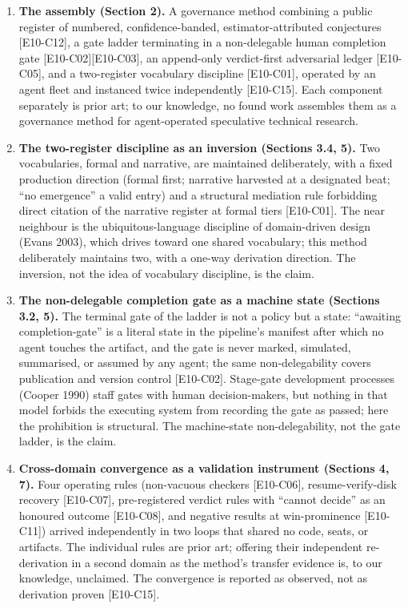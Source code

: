 \documentclass[
  11pt,
]{article}
\begin{document}
\begin{enumerate}
\def\labelenumi{\arabic{enumi}.}
\item
  \textbf{The assembly (Section 2).} A governance method combining a
  public register of numbered, confidence-banded, estimator-attributed
  conjectures {[}E10-C12{]}, a gate ladder terminating in a
  non-delegable human completion gate {[}E10-C02{]}{[}E10-C03{]}, an
  append-only verdict-first adversarial ledger {[}E10-C05{]}, and a
  two-register vocabulary discipline {[}E10-C01{]}, operated by an agent
  fleet and instanced twice independently {[}E10-C15{]}. Each component
  separately is prior art; to our knowledge, no found work assembles
  them as a governance method for agent-operated speculative technical
  research.
\item
  \textbf{The two-register discipline as an inversion (Sections 3.4,
  5).} Two vocabularies, formal and narrative, are maintained
  deliberately, with a fixed production direction (formal first;
  narrative harvested at a designated beat; ``no emergence'' a valid
  entry) and a structural mediation rule forbidding direct citation of
  the narrative register at formal tiers {[}E10-C01{]}. The near
  neighbour is the ubiquitous-language discipline of domain-driven
  design (Evans 2003), which drives toward one shared vocabulary; this
  method deliberately maintains two, with a one-way derivation
  direction. The inversion, not the idea of vocabulary discipline, is
  the claim.
\item
  \textbf{The non-delegable completion gate as a machine state (Sections
  3.2, 5).} The terminal gate of the ladder is not a policy but a state:
  ``awaiting completion-gate'' is a literal state in the pipeline's
  manifest after which no agent touches the artifact, and the gate is
  never marked, simulated, summarised, or assumed by any agent; the same
  non-delegability covers publication and version control {[}E10-C02{]}.
  Stage-gate development processes (Cooper 1990) staff gates with human
  decision-makers, but nothing in that model forbids the executing
  system from recording the gate as passed; here the prohibition is
  structural. The machine-state non-delegability, not the gate ladder,
  is the claim.
\item
  \textbf{Cross-domain convergence as a validation instrument (Sections
  4, 7).} Four operating rules (non-vacuous checkers {[}E10-C06{]},
  resume-verify-disk recovery {[}E10-C07{]}, pre-registered verdict
  rules with ``cannot decide'' as an honoured outcome {[}E10-C08{]}, and
  negative results at win-prominence {[}E10-C11{]}) arrived
  independently in two loops that shared no code, seats, or artifacts.
  The individual rules are prior art; offering their independent
  re-derivation in a second domain as the method's transfer evidence is,
  to our knowledge, unclaimed. The convergence is reported as observed,
  not as derivation proven {[}E10-C15{]}.
\end{enumerate}
\end{document}
